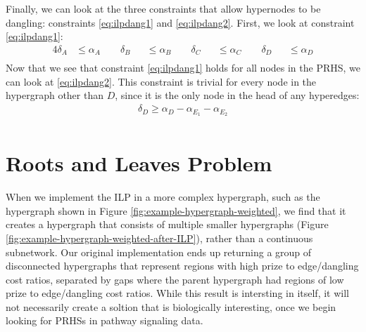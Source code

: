 \documentclass[12pt,twoside]{reedthesis}
\theoremstyle{definition}
\begin{document}
Finally, we can look at the three constraints that allow hypernodes to be dangling: constraints \eqref{eq:ilpdang1} and \eqref{eq:ilpdang2}. First, we look at constraint \eqref{eq:ilpdang1}:
\begin{alignat*}{4}
  \delta_A &\leq \alpha_A \qquad \delta_B &&\leq \alpha_B \qquad \delta_C &&\leq \alpha_C \qquad \delta_D &&\leq \alpha_D\\
\end{alignat*}%
Now that we see that constraint \eqref{eq:ilpdang1} holds for all nodes in the PRHS, we can look at \ref{eq:ilpdang2}. This constraint is trivial for every node in the hypergraph other than $D$, since it is the only node in the head of any hyperedges:
\begin{align*}
 \delta_D \geq \alpha_{D} - \alpha_{E_1} - \alpha_{E_2}\\
\end{align*}%


\section{Roots and Leaves Problem}

When we implement the ILP in a more complex hypergraph, such as the hypergraph shown in Figure \ref{fig:example-hypergraph-weighted}, we find that it creates a hypergraph that consists of multiple smaller hypergraphs (Figure \ref{fig:example-hypergraph-weighted-after-ILP}), rather than a continuous subnetwork. Our original implementation ends up returning a group of disconnected hypergraphs that represent regions with high prize to edge/dangling cost ratios, separated by gaps where the parent hypergraph had regions of low prize to edge/dangling cost ratios. While this result is intersting in itself, it will not necessarily create a soltion that is biologically interesting, once we begin looking for PRHSs in pathway signaling data.\par
\end{document}
